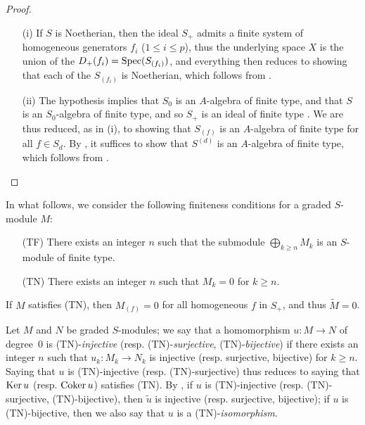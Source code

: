 \begin{proof}
\begin{enumerate}
  \item[{\rm(i)}] If $S$ is Noetherian, then the ideal $S_+$ admits a finite system of homogeneous generators $f_i$ ($1\leq i\leq p$), thus  the underlying space $X$ is the union of the $D_+(f_i)=\operatorname{Spec}(S_{(f_i)})$, and everything then reduces to showing that each of the $S_{(f_i)}$ is Noetherian, which follows from .
  \item[{\rm(ii)}] The hypothesis implies that $S_0$ is an $A$-algebra of finite type, and that $S$ is an $S_0$-algebra of finite type, and so $S_+$ is an ideal of finite type .
    We are thus reduced, as in (i), to showing that $S_{(f)}$ is an $A$-algebra of finite type for all $f\in S_d$.
    By , it suffices to show that $S^{(d)}$ is an $A$-algebra of finite type, which follows from .
\end{enumerate}
\end{proof}

\begin{env}[2.7.2]
\label{II.2.7.2}
In what follows, we consider the following finiteness conditions for a graded $S$-module $M$:
\begin{enumerate}
  \item[{\rm(TF)}] There exists an integer $n$ such that the submodule $\bigoplus_{k\geq n}M_k$ is an $S$-module of finite type.
  \item[{\rm(TN)}] There exists an integer $n$ such that $M_k=0$ for $k\geq n$.
\end{enumerate}

If $M$ satisfies (TN), then $M_{(f)}=0$ for all homogeneous $f$ in $S_+$, and thus $\widetilde{M}=0$.

Let $M$ and $N$ be graded $S$-modules;
we say that a homomorphism $u: M\to N$ of degree~$0$ is (TN)-\emph{injective} (resp. (TN)-\emph{surjective}, (TN)-\emph{bijective}) if there exists an integer $n$ such that $u_k:M_k\to N_k$ is injective (resp. surjective, bijective) for $k\geq n$.
Saying that $u$ is (TN)-injective (resp. (TN)-surjective) thus reduces to saying that $\operatorname{Ker} u$ (resp. $\operatorname{Coker} u$) satisfies (TN).
By , if $u$ is (TN)-injective (resp. (TN)-surjective, (TN)-bijective), then $\widetilde{u}$ is injective (resp. surjective, bijective);
if $u$ is (TN)-bijective, then we also say that $u$ is a (TN)-\emph{isomorphism}.
\end{env}

